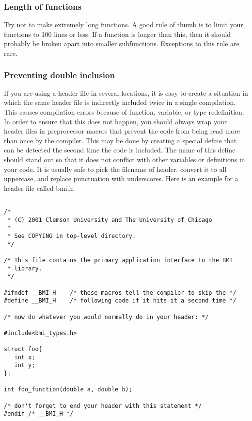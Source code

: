 \documentclass[11pt, letterpaper]{article}
\begin{document}
\subsubsection{Length of functions}

Try not to make extremely long functions.  A good rule of thumb is to
limit your functions to 100 lines or less.  If a function is longer than
this, then it should probably be broken apart into smaller subfunctions.
Exceptions to this rule are rare.

\subsubsection{Preventing double inclusion}

If you are using a header file in several locations, it is easy to
create a situation in which the same header file is indirectly included
twice in a single compilation.  This causes compilation errors because
of function, variable, or type redefinition.  In order to ensure that
this does not happen, you should always wrap your header files in
preprocessor macros that prevent the code from being read more than once
by the compiler.  This may be done by creating a special define that can
be detected the second time the code is included.  The name of this
define should stand out so that it does not conflict with other
variables
or definitions in your code.  It is usually safe to pick the filename of
header, convert it to all uppercase, and replace punctuation with
underscores.  Here is an example for a header file called bmi.h:

\begin{verbatim}

/*
 * (C) 2001 Clemson University and The University of Chicago
 *
 * See COPYING in top-level directory.
 */

/* This file contains the primary application interface to the BMI
 * library.
 */

#ifndef __BMI_H    /* these macros tell the compiler to skip the */
#define __BMI_H    /* following code if it hits it a second time */

/* now do whatever you would normally do in your header: */

#include<bmi_types.h>

struct foo{
   int x;
   int y;
};

int foo_function(double a, double b);

/* don't forget to end your header with this statement */
#endif /* __BMI_H */   


\end{verbatim}
\end{document}
